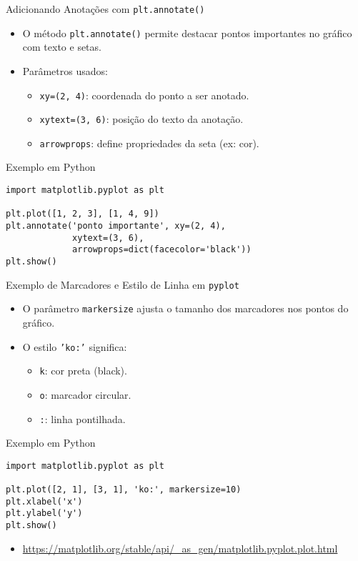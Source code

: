 \begin{frame}[fragile]{Adicionando Anotações com \texttt{plt.annotate()}}
    \begin{itemize}
        \item O método \texttt{plt.annotate()} permite destacar pontos importantes no gráfico com texto e setas.
        \item Parâmetros usados:
              \begin{itemize}
                  \item \texttt{xy=(2, 4)}: coordenada do ponto a ser anotado.
                  \item \texttt{xytext=(3, 6)}: posição do texto da anotação.
                  \item \texttt{arrowprops}: define propriedades da seta (ex: cor).
              \end{itemize}
    \end{itemize}

    \begin{block}{Exemplo em Python}
        \begin{verbatim}
import matplotlib.pyplot as plt

plt.plot([1, 2, 3], [1, 4, 9])
plt.annotate('ponto importante', xy=(2, 4),
             xytext=(3, 6),
             arrowprops=dict(facecolor='black'))
plt.show()
\end{verbatim}
    \end{block}
\end{frame}


\begin{frame}[fragile]{Exemplo de Marcadores e Estilo de Linha em \texttt{pyplot}}
    \begin{itemize}
        \item O parâmetro \texttt{markersize} ajusta o tamanho dos marcadores nos pontos do gráfico.
        \item O estilo \texttt{'ko:'} significa:
              \begin{itemize}
                  \item \texttt{k}: cor preta (black).
                  \item \texttt{o}: marcador circular.
                  \item \texttt{:}: linha pontilhada.
              \end{itemize}
    \end{itemize}

    \begin{block}{Exemplo em Python}
        \begin{verbatim}
import matplotlib.pyplot as plt

plt.plot([2, 1], [3, 1], 'ko:', markersize=10)
plt.xlabel('x')
plt.ylabel('y')
plt.show()
\end{verbatim}
    \end{block}
    \begin{itemize}
        \item  \url{https://matplotlib.org/stable/api/_as_gen/matplotlib.pyplot.plot.html}
    \end{itemize}
\end{frame}

